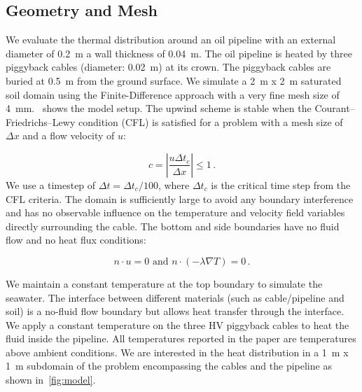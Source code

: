 \documentclass[Journal,letterpaper,InsideFigs]{ascelike-new}
\begin{document}
\subsection*{Geometry and Mesh}

We evaluate the thermal distribution around an oil pipeline with an external diameter of \SI{0.2}{\meter} a wall thickness of \SI{0.04}{\meter}. The oil pipeline is heated by three piggyback cables (diameter: \SI{0.02}{\meter}) at its crown. The piggyback cables are buried at \SI{0.5}{\meter} from the ground surface. We simulate a \SI{2}{\meter} x \SI{2}{\meter} saturated soil domain using the Finite-Difference approach with a very fine mesh size of \SI{4}{\milli\meter}.~ shows the model setup. The upwind scheme is stable when the Courant–Friedrichs–Lewy condition (CFL) is satisfied for a problem with a mesh size of $\Delta x$ and a flow velocity of $u$:

\begin{equation}
c = |\frac{u \Delta t_c}{\Delta x}| \le 1\,.
\end{equation}
\noindent We use a timestep of $\Delta t = \Delta t_c / 100$, where $\Delta t_c$ is the critical time step from the CFL criteria. The domain is sufficiently large to avoid any boundary interference and has no observable influence on the temperature and velocity field variables directly surrounding the cable. The bottom and side boundaries have no fluid flow and no heat flux conditions:

\begin{equation}
n \cdot u = 0 \text{ and } n \cdot (-\lambda \nabla T) = 0\,.
\end{equation}

We maintain a constant temperature at the top boundary to simulate the seawater. The interface between different materials (such as cable/pipeline and soil) is a no-fluid flow boundary but allows heat transfer through the interface. We apply a constant temperature on the three HV piggyback cables to heat the fluid inside the pipeline. All temperatures reported in the paper are temperatures above ambient conditions. We are interested in the heat distribution in a \SI{1}{\meter} x \SI{1}{\meter} subdomain of the problem encompassing the cables and the pipeline as shown in~\cref{fig:model}.
\end{document}
